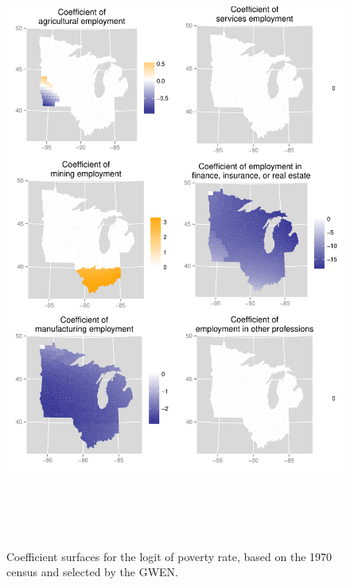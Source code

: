 \documentclass[authoryear, review, 11pt]{elsarticle}
\begin{document}
	\begin{figure}
		\begin{center}
			\includegraphics[height=8in]{../../figures/poverty/1970-GWEN-coefficients}
			\caption{Coefficient surfaces for the logit of poverty rate, based on the 1970 census and selected by the GWEN. \label{fig:unshrunk-enet-coefs-1970}}
		\end{center}
	\end{figure}	
		
\end{document}
